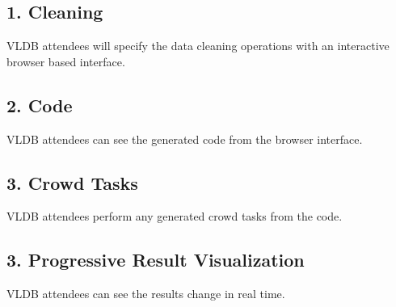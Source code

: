 \subsection{1. Cleaning}
VLDB attendees will specify the data cleaning operations with an interactive browser based
interface. 

\subsection{2. Code}
VLDB attendees can see the generated code from the browser interface.

\subsection{3. Crowd Tasks}
VLDB attendees perform any generated crowd tasks from the code.  

\subsection{3. Progressive Result Visualization}
VLDB attendees can see the results change in real time.  
\fi
